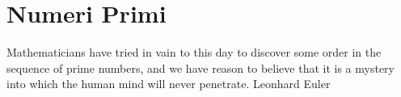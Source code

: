 \label{numeriprimi}
\chapter{Numeri Primi}

\citazioneinizioparagrafo
  {Mathematicians have tried in vain to this day to discover some
   order in the sequence of prime numbers, and we have reason to believe
   that it is a mystery into which the human mind will never penetrate.}
  {Leonhard Euler}

